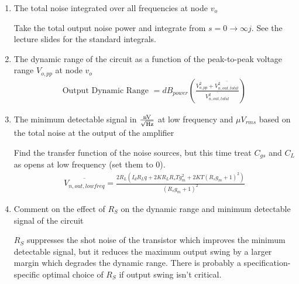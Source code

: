 \begin{enumerate}[label=(\alph*)]
  \item {\color{blue}The total noise integrated over all frequencies at node $v_o$}

    Take the total output noise power and integrate from $s = 0 \rightarrow \infty j$. See the lecture slides for the standard integrals.

  \item {\color{blue}The dynamic range of the circuit as a function of the peak-to-peak voltage range $V_{o,pp}$ at node $v_o$}
    \begin{align*}
      \text{Output Dynamic Range } = dB_{power} \left( \frac{V_{o,pp}^2 + \overline{V_{n, out, total}^2}}{\overline{V_{n, out, total}^2}} \right)
    \end{align*}

  \item {\color{blue}The minimum detectable signal in $\frac{\text{nV}}{\sqrt{\text{Hz}}}$ at low frequency and $\mu V_{rms}$ based on the total noise at the output of the amplifier}

    Find the transfer function of the noise sources, but this time treat $C_{gs}$ and $C_{L}$ as opens at low frequency (set them to 0).
    \begin{align*}
      \overline{V_{n,out,lowfreq}} = \frac{2 R_{L} \left(I_{d} R_{L} q + 2 K R_{L} R_{s} T g_{m}^{2} + 2 K T \left(R_{s} g_{m} + 1\right)^{2}\right)}{\left(R_{s} g_{m} + 1\right)^{2}}
    \end{align*}

  \item {\color{blue}Comment on the effect of $R_S$ on the dynamic range and minimum detectable signal of the circuit}

    $R_S$ suppresses the shot noise of the transistor which improves the minimum detectable signal, but it reduces the maximum output swing by a larger margin which degrades the dynamic range. There is probably a specification-specific optimal choice of $R_S$ if output swing isn't critical.
\end{enumerate}

